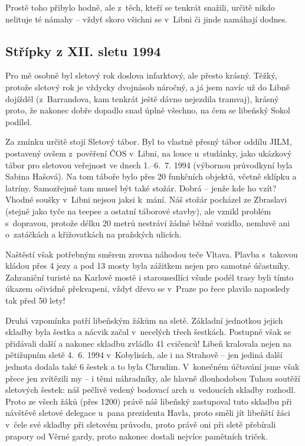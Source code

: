 \documentclass[a5paper, 11pt, twoside]{article}
\begin{document}
Prostě toho přibylo hodně, ale z~těch, kteří se tenkrát snažili, určitě
nikdo nelituje té námahy -- vždyť skoro všichni se v~Libni či jinde
namáhají dodnes.

\subsection{Střípky z XII. sletu 1994}

Pro mě osobně byl sletový rok doslova infarktový, ale přesto krásný.
Těžký, protože sletový rok je vždycky dvojnásob náročný, a já jsem navíc
už do Libně dojížděl (z~Barrandova, kam tenkrát ještě dávno nejezdila
tramvaj), krásný proto, že nakonec dobře dopadlo snad úplně všechno, na
čem se libeňský Sokol podílel.

Za zmínku určitě stojí Sletový tábor. Byl to vlastně přesný tábor oddílu
JILM, postavený ovšem z~pověření ČOS v~Libni, na louce u~studánky, jako
ukázkový tábor pro sletovou veřejnost ve dnech 1.--6.~7. 1994 (výbornou
průvodkyní byla Sabina Hašová). Na tom táboře bylo přes 20 funkčních
objektů, včetně sklípku a latríny. Samozřejmě tam musel být také stožár.
Dobrá -- jenže kde ho vzít? Vhodné soušky v~Libni nejsou jaksi k~mání.
Náš stožár pocházel ze Zbraslavi (stejně jako tyče na teepee a ostatní
táborové stavby), ale vznikl problém s~dopravou, protože délku 20 metrů
nestráví žádné běžné vozidlo, nemluvě ani o~zatáčkách a křižovatkách na
pražských ulicích.

Naštěstí však potřebným směrem zrovna náhodou teče Vltava. Plavba
s~takovou kládou přes 4 jezy a pod 13 mosty byla zážitkem nejen pro
samotné účastníky. Zahraniční turisté na Karlově mostě i starousedlíci
všude podél trasy byli tímto úkazem očividně překvapeni, vždyť dřevo se
v~Praze po řece plavilo naposledy tak před 50 lety!

Druhá vzpomínka patří libeňským žákům na sletě. Základní jednotkou
jejich skladby byla šestka a nácvik začal v~necelých třech šestkách.
Postupně však se přidávali další a nakonec skladbu zvládlo 41 cvičenců!
Libeň kralovala nejen na pětižupním sletě 4.~6. 1994 v~Kobylisích, ale i
na Strahově -- jen jediná další jednota dodala také 6 šestek a to byla
Chrudim. V~konečném účtování jsme však přece jen zvítězili my -- i těmi
náhradníky, ale hlavně dlouhodobou Tuhou soutěží sletových šestek: náš
pečlivě vedený bodovací arch u~vedoucích skladby rozhodl. Proto ze všech
žáků (přes 1200) právě náš libeňský zastupoval tuto skladbu při návštěvě
sletové delegace u~pana prezidenta Havla, proto směli jít libeňští žáci
v~čele své skladby při sletovém průvodu, proto právě oni při sletě
přebírali prapory od Věrné gardy, proto nakonec dostali nejvíce
pamětních triček.
\end{document}
